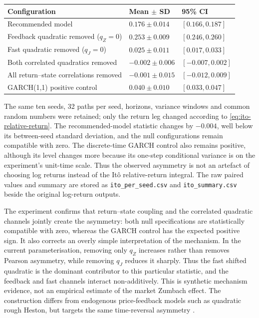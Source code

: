\documentclass[11pt,a4paper]{article}
\begin{document}
\begin{center}
\begin{tabularx}{0.96\textwidth}{@{}Y C{27mm} C{31mm}@{}}
\toprule
\textbf{Configuration} & \textbf{Mean \(\pm\) SD} & \textbf{95\% CI} \\
\midrule
Recommended model & \(0.176\pm0.014\) & \([0.166,0.187]\) \\
Feedback quadratic removed (\(q_Z=0\)) & \(0.253\pm0.009\) & \([0.246,0.260]\) \\
Fast quadratic removed (\(q_J=0\)) & \(0.025\pm0.011\) & \([0.017,0.033]\) \\
Both correlated quadratics removed & \(-0.002\pm0.006\) & \([-0.007,0.002]\) \\
All return--state correlations removed & \(-0.001\pm0.015\) & \([-0.012,0.009]\) \\
GARCH(1,1) positive control & \(0.040\pm0.010\) & \([0.033,0.047]\) \\
\bottomrule
\end{tabularx}
\end{center}

The same ten seeds, 32 paths per seed, horizons, variance windows and common random numbers
were retained; only the return leg changed according to \cref{eq:ito-relative-return}.  The
recommended-model statistic changes by \(-0.004\), well below its between-seed standard
deviation, and the null configurations remain compatible with zero.  The discrete-time GARCH
control also remains positive, although its level changes more because its one-step conditional
variance is on the experiment's unit-time scale.  Thus the observed asymmetry is not an artefact
of choosing log returns instead of the It\^o relative-return integral.  The raw paired values
and summary are stored as \nolinkurl{ito_per_seed.csv} and \nolinkurl{ito_summary.csv} beside
the original log-return outputs.

The experiment confirms that return--state coupling and the correlated quadratic channels
jointly create the asymmetry: both null specifications are statistically compatible with zero,
whereas the GARCH control has the expected positive sign.  It also corrects an overly simple
interpretation of the mechanism.  In the current parameterisation, removing only \(q_Z\)
increases rather than removes Pearson asymmetry, while removing \(q_J\) reduces it sharply.
Thus the fast shifted quadratic is the dominant contributor to this particular statistic, and
the feedback and fast channels interact non-additively.  This is synthetic mechanism evidence,
not an empirical estimate of the market Zumbach effect.  The construction differs from
endogenous price-feedback models such as quadratic rough Heston, but targets the same
time-reversal asymmetry \cite{zumbach2009,gatheral2020}.
\end{document}
